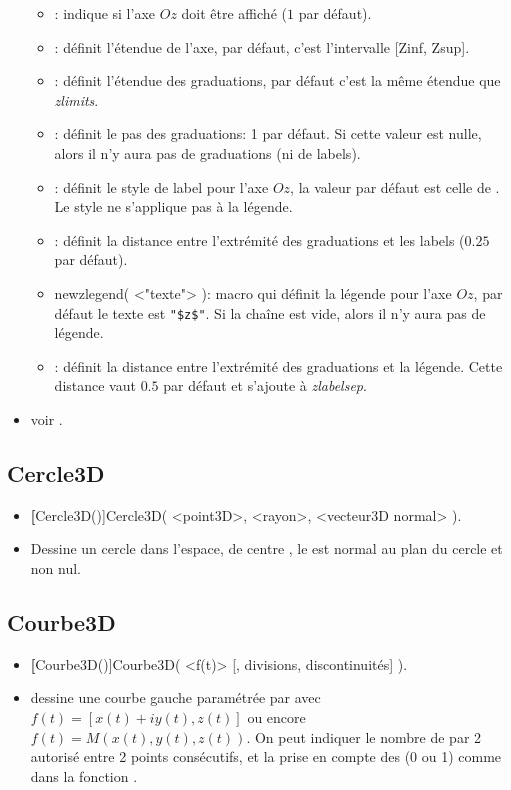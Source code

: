 \begin{itemize}
\begin{itemize}
  \item {}: indique si l'axe $Oz$ doit être affiché ($1$ par défaut).
  \item {}: définit l'étendue de l'axe, par défaut, c'est l'intervalle [Zinf, Zsup].
  \item {}: définit l'étendue des graduations, par défaut c'est la même étendue que \textit{zlimits}.
  \item {}: définit le pas des graduations: 1 par défaut. Si cette valeur est nulle, alors il n'y aura pas de graduations (ni de labels).
  \item {}: définit le style de label pour l'axe $Oz$, la valeur par défaut est celle de . Le style ne s'applique pas à la légende.
  \item {}: définit la distance entre l'extrémité des graduations et les labels ($0.25$ par défaut).
  \item \textcolor{\coloropt}{newzlegend( <"texte"> )}: macro qui définit la légende pour l'axe $Oz$, par défaut le texte est \verb|"$z$"|. Si la chaîne est vide, alors il n'y aura pas de légende.
  \item {}: définit la distance entre l'extrémité des graduations et la légende. Cette distance vaut $0.5$ par défaut et s'ajoute à \textit{zlabelsep}.
  \end{itemize}
 \item \exem voir .
\end{itemize}



\subsection{Cercle3D}
\begin{itemize}
 \item \util \textbf[Cercle3D()]{Cercle3D( <point3D>, <rayon>, <vecteur3D normal> )}.
 \item \desc Dessine un cercle dans l'espace, de centre , le  est normal au plan du cercle et non nul.
\end{itemize}

\subsection{Courbe3D}
\begin{itemize}
 \item \util \textbf[Courbe3D()]{Courbe3D( <f(t)> [, divisions, discontinuités] )}.
 \item \desc dessine une courbe gauche paramétrée par  avec $f(t)=[x(t)+iy(t), z(t)]$ ou encore $f(t)=M(x(t), y(t), z(t))$. On peut indiquer le nombre de  par 2 autorisé entre 2 points consécutifs, et la prise en compte des  (0 ou 1) comme dans la fonction .
\end{itemize}


